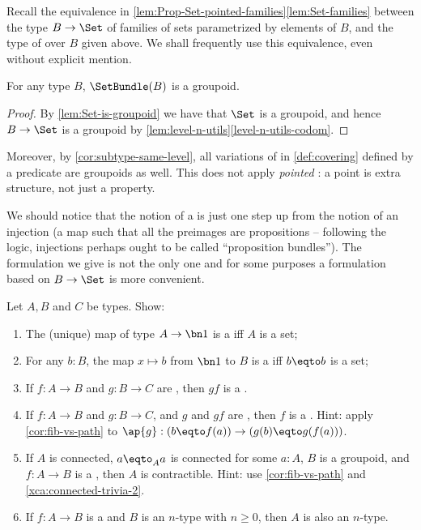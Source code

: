 Recall the equivalence in \cref{lem:Prop-Set-pointed-families}\ref{lem:Set-families}
between the type $B\to\Set$ of families of sets parametrized by elements of $B$, and the type
of \coverings over $B$ given above.
We shall frequently use this equivalence, even without explicit mention.

\begin{lemma}\label{lem:setbundle-is-groupoid}
For any type $B$, $\SetBundle(B)$ is a groupoid.
\end{lemma}
\begin{proof}
By \cref{lem:Set-is-groupoid} we have that $\Set$ is a groupoid,
and hence $B\to\Set$ is a groupoid by
\cref{lem:level-n-utils}\ref{level-n-utils-codom}.
\end{proof}
Moreover, by \cref{cor:subtype-same-level}, all variations
of \coverings in \cref{def:covering}
defined by a predicate are groupoids as well. This does not apply
\emph{pointed} \coverings:
a point is extra structure, not just a property.

We should notice that the notion of a \covering is just one step up from the notion of an
injection (a map such that all the preimages are propositions --
following the logic, injections perhaps ought to be called ``proposition bundles'').
The formulation we give is not the only one and for some purposes a formulation
based on $B\to\Set$ is more convenient.

\begin{xca}\label{xca:covering-utils}
Let $A,B$ and $C$ be types. Show:
\begin{enumerate}
\item The (unique) map of type $A\to\bn 1$ is a \covering iff $A$ is a set;
\item For any $b:B$, the map $x \mapsto b$ from $\bn 1$ to $B$ is
a \covering iff $b\eqto b$ is a set;
\item If $f: A\to B$ and $g: B\to C$ are \coverings, then $gf$ is a \covering.
\item\label{it:left-cancel-cover}
If $f: A\to B$ and $g: B\to C$, and $g$ and $gf$ are \coverings,
then $f$ is a \covering. Hint: apply \cref{cor:fib-vs-path} to
$\ap{g}: (b\eqto f(a))\to(g(b)\eqto g(f(a)))$.
\item If $A$ is connected, $a\eqto_A a$ is connected for some $a:A$,
$B$ is a groupoid, and $f: A\to B$ is a \covering, then $A$ is contractible.
Hint: use \cref{cor:fib-vs-path} and \cref{xca:connected-trivia-2}.
\item \label{it:cover-n-type}
If $f: A\to B$ is a \covering and $B$ is an $n$-type with $n\geq 0$,
then $A$ is also an $n$-type.\qedhere
\end{enumerate}
\end{xca}

